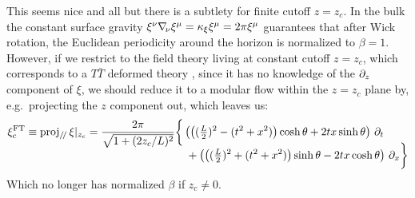 \documentclass[11pt,a4paper,utf8]{article}
\newcommand{\TTbar}{\ensuremath{T\bar{T}}\xspace}
\begin{document}
	

	
	This seems nice and all but there is a subtlety for finite cutoff $z = z_c$. 
	In the bulk the constant surface gravity $
		\xi^\nu \nabla_{\!\mathnormal{\nu}} \xi^\mu
		= \kappa_\xi \xi^\mu
		= 2\pi \xi^\mu
	$ guarantees that after Wick rotation, the Euclidean periodicity around the horizon is normalized to $\beta = 1$. However, if we restrict to the field theory living at constant cutoff $z = z_c$, which corresponds to a \TTbar deformed theory \cite{McGough:2016lol,Lewkowycz:2019xse} , since it has no knowledge of the $\partial_{z}$ component of $\xi$, we should reduce it to a modular flow within the $z = z_c$ plane by, e.g.~projecting the $z$ component out, which leaves us:
	\begin{equation}
	\begin{aligned}
		\xi^{\mathrm{FT}}_c
		\equiv \operatorname{proj_{\mathit{\text{/\!/}}}} \xi|_{z_c}
		= \frac{2\pi}{
				\sqrt{1 + (2z_c/L)^2}
			}
		& \bigg\{
			\left(
				\left(
					(\tfrac{L}{2})^2
					- (t^2 + x^2)
				\right) \cosh\theta
				+ 2tx \sinh\theta
			\right) \,\partial_{t}
		\\[-2ex] &\quad 
			+ \left(
				\left(
					(\tfrac{L}{2})^2
					+ (t^2 + x^2)
				\right) \sinh\theta
				- 2tx \cosh\theta
			\right) \,\partial_{x}
		\bigg\}
	\end{aligned}
	\end{equation}
	Which no longer has normalized $\beta$ if $z_c \ne 0$.
	
\end{document}
